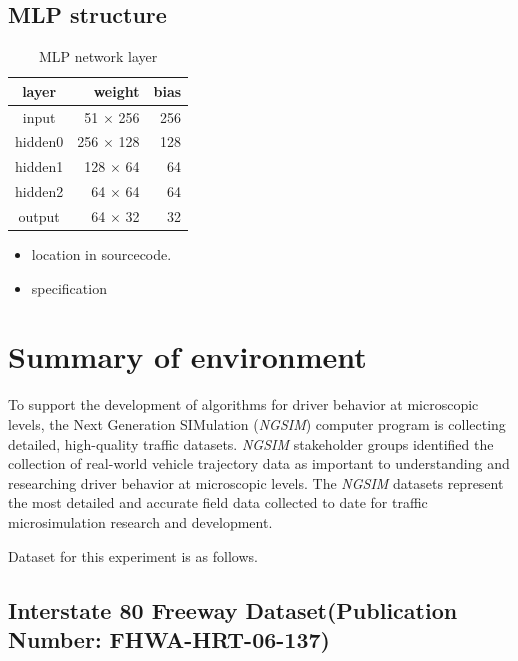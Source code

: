 \subsection{MLP structure}



\begin{table}[H]
\centering
\begin{tabular}{|c|r|r|}
\hline 
layer  & weight   & bias \\ \hline \hline
input  & 51 $\times$ 256 & 256  \\
hidden0 & 256 $\times$ 128 & 128 \\
hidden1 & 128 $\times$ 64  & 64  \\
hidden2 & 64 $\times$ 64   & 64  \\
output & 64 $\times$ 32   & 32  \\
\hline
\end{tabular} 
\caption{MLP network layer}
\label{tab:reward_mlp_network}
\end{table}



\begin{itemize}
\item location in sourcecode.
\item specification
\end{itemize}

\pagebreak
\section{Summary of environment}

To support the development of algorithms for driver behavior at microscopic levels, the Next Generation SIMulation ({\it NGSIM}) computer program is collecting detailed, high-quality traffic datasets. {\it NGSIM} stakeholder groups identified the collection of real-world vehicle trajectory data as important to understanding and researching driver behavior at microscopic levels. The {\it NGSIM} datasets represent the most detailed and accurate field data collected to date for traffic microsimulation research and development. 





Dataset for this experiment is as follows.


\subsection{Interstate 80 Freeway Dataset(Publication Number: FHWA-HRT-06-137)}

